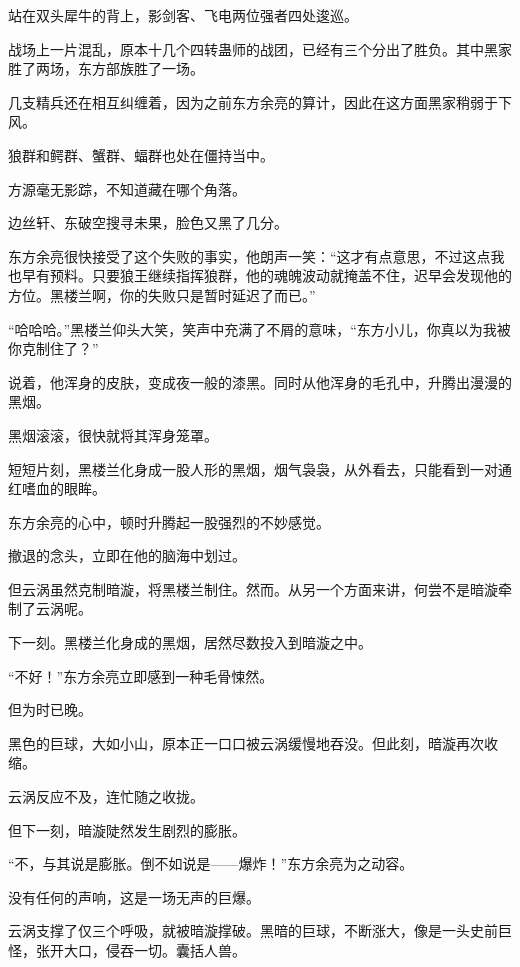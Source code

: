 
\begin{this_body}



站在双头犀牛的背上，影剑客、飞电两位强者四处逡巡。

战场上一片混乱，原本十几个四转蛊师的战团，已经有三个分出了胜负。其中黑家胜了两场，东方部族胜了一场。

几支精兵还在相互纠缠着，因为之前东方余亮的算计，因此在这方面黑家稍弱于下风。

狼群和鳄群、蟹群、蝠群也处在僵持当中。

方源毫无影踪，不知道藏在哪个角落。

边丝轩、东破空搜寻未果，脸色又黑了几分。

东方余亮很快接受了这个失败的事实，他朗声一笑：“这才有点意思，不过这点我也早有预料。只要狼王继续指挥狼群，他的魂魄波动就掩盖不住，迟早会发现他的方位。黑楼兰啊，你的失败只是暂时延迟了而已。”

“哈哈哈。”黑楼兰仰头大笑，笑声中充满了不屑的意味，“东方小儿，你真以为我被你克制住了？”

说着，他浑身的皮肤，变成夜一般的漆黑。同时从他浑身的毛孔中，升腾出漫漫的黑烟。

黑烟滚滚，很快就将其浑身笼罩。

短短片刻，黑楼兰化身成一股人形的黑烟，烟气袅袅，从外看去，只能看到一对通红嗜血的眼眸。

东方余亮的心中，顿时升腾起一股强烈的不妙感觉。

撤退的念头，立即在他的脑海中划过。

但云涡虽然克制暗漩，将黑楼兰制住。然而。从另一个方面来讲，何尝不是暗漩牵制了云涡呢。

下一刻。黑楼兰化身成的黑烟，居然尽数投入到暗漩之中。

“不好！”东方余亮立即感到一种毛骨悚然。

但为时已晚。

黑色的巨球，大如小山，原本正一口口被云涡缓慢地吞没。但此刻，暗漩再次收缩。

云涡反应不及，连忙随之收拢。

但下一刻，暗漩陡然发生剧烈的膨胀。

“不，与其说是膨胀。倒不如说是——爆炸！”东方余亮为之动容。

没有任何的声响，这是一场无声的巨爆。

云涡支撑了仅三个呼吸，就被暗漩撑破。黑暗的巨球，不断涨大，像是一头史前巨怪，张开大口，侵吞一切。囊括人兽。


\end{this_body}
